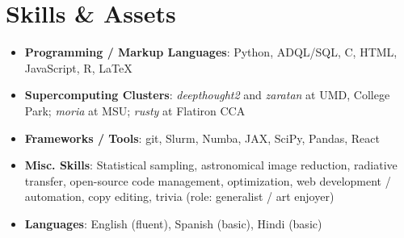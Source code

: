 \documentclass[letterpaper,11.5pt]{article}
\newcommand{\resumeItem}[2]{
  \item\small{
    \textbf{#1}{#2 \vspace{-2pt}}
  }
}
\newcommand{\resumeSubHeadingListStart}{\begin{itemize}[leftmargin=*]}
\newcommand{\resumeSubHeadingListEnd}{\end{itemize}}
\newcommand{\resumeItemListStart}{\begin{itemize}}
\newcommand{\resumeItemListEnd}{\end{itemize}\vspace{-5pt}}
\newcommand{\shorterSection}[1]{\vspace{-10pt}\section{#1}}
\begin{document}





\vspace{2pt}
\shorterSection{Skills \& Assets}
  \resumeSubHeadingListStart
  \small
    \item{
     \textbf{Programming / Markup Languages}{: Python, ADQL/SQL, C, HTML, JavaScript, R, \LaTeX}
    }
    \vspace{-5pt}
    \item{
     \textbf{Supercomputing Clusters}{: \textit{deepthought2} and \textit{zaratan} at UMD, College Park; \textit{moria} at MSU; \textit{rusty} at Flatiron CCA}
    }
    \vspace{-5pt}
    \item{
     \textbf{Frameworks / Tools}{: git, Slurm, Numba, JAX, SciPy, Pandas, React}
    }
    \vspace{-5pt}
    \item{
     \textbf{Misc. Skills}{: Statistical sampling, astronomical image reduction, radiative transfer, open-source code management, optimization, web development / automation, copy editing, trivia (role: generalist / art enjoyer)}
    }
    \vspace{-5pt}
    \item{
     \textbf{Languages}{: English (fluent), Spanish (basic), Hindi (basic)}
    }
\resumeSubHeadingListEnd
\end{document}
